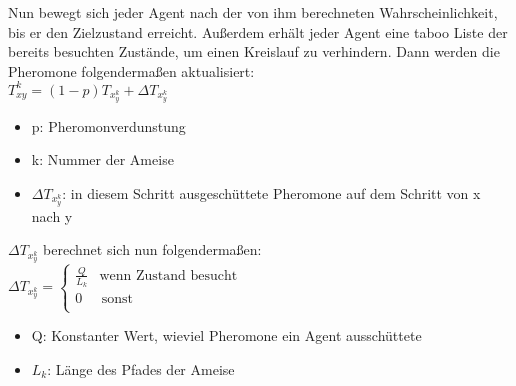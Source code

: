 Nun bewegt sich jeder Agent nach der von ihm berechneten Wahrscheinlichkeit, bis er den Zielzustand erreicht. Außerdem erhält jeder Agent eine taboo Liste der bereits besuchten Zustände, um einen Kreislauf zu verhindern. Dann werden die Pheromone folgendermaßen aktualisiert:\\\large
$T_{xy}^k=(1-p)T_x_y^k+\Delta T_x_y^k$\normalsize
\begin{itemize}
  \item p: Pheromonverdunstung
  \item k: Nummer der Ameise
  \item $\Delta T_x_y^k$: in diesem Schritt ausgeschüttete Pheromone auf dem Schritt von x nach y
\end{itemize}
$\Delta T_x_y^k$ berechnet sich nun folgendermaßen:\\
\large
$\Delta T_x_y^k = \left\{
\begin{array}{ll}
\frac{Q}{L_k} & \textrm{wenn Zustand besucht} \\
0 & \, \textrm{sonst} \\
\end{array}
\right. $
\normalsize
\begin{itemize}
    \item Q: Konstanter Wert, wieviel Pheromone ein Agent ausschüttete
    \item $L_k$: Länge des Pfades der Ameise
\end{itemize}

